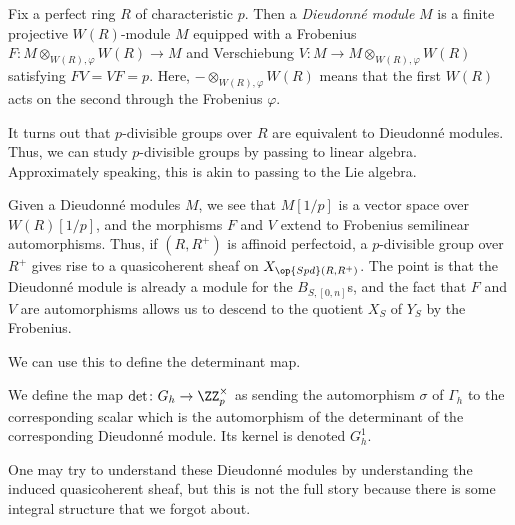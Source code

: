 \documentclass[../notes.tex]{subfiles}
\begin{document}
\begin{definition}
	Fix a perfect ring $R$ of characteristic $p$. Then a \textit{Dieudonn\'e module} $M$ is a finite projective $W(R)$-module $M$ equipped with a Frobenius $F\colon M\otimes_{W(R),\varphi}W(R)\to M$ and Verschiebung $V\colon M\to M\otimes_{W(R),\varphi}W(R)$ satisfying $FV=VF=p$. Here, $-\otimes_{W(R),\varphi}W(R)$ means that the first $W(R)$ acts on the second through the Frobenius $\varphi$.
\end{definition}
\begin{remark}
	It turns out that $p$-divisible groups over $R$ are equivalent to Dieudonn\'e modules. Thus, we can study $p$-divisible groups by passing to linear algebra. Approximately speaking, this is akin to passing to the Lie algebra.
\end{remark}
\begin{remark}
	Given a Dieudonn\'e modules $M$, we see that $M[1/p]$ is a vector space over $W(R)[1/p]$, and the morphisms $F$ and $V$ extend to Frobenius semilinear automorphisms. Thus, if $(R,R^+)$ is affinoid perfectoid, a $p$-divisible group over $R^+$ gives rise to a quasicoherent sheaf on $X_{\op{Spd}(R,R^+)}$. The point is that the Dieudonn\'e module is already a module for the $B_{S,[0,n]}$s, and the fact that $F$ and $V$ are automorphisms allows us to descend to the quotient $X_S$ of $Y_S$ by the Frobenius.
\end{remark}
We can use this to define the determinant map.
\begin{definition}
	We define the map $\det\colon G_h\to\ZZ_p^\times$ as sending the automorphism $\sigma$ of $\Gamma_h$ to the corresponding scalar which is the automorphism of the determinant of the corresponding Dieudonn\'e module. Its kernel is denoted $G_h^1$.
\end{definition}
One may try to understand these Dieudonn\'e modules by understanding the induced quasicoherent sheaf, but this is not the full story because there is some integral structure that we forgot about.
	
\end{document}
